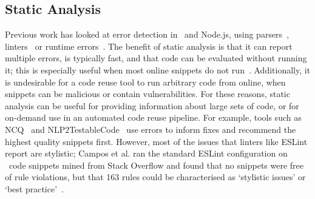 \documentclass[conference]{IEEEtran}
\begin{document}

\subsection{Static Analysis}

Previous work has looked at error detection in \js\ and Node.js, using parsers~\cite{yang2016query}, linters~\cite{campos2019mining, reidNCQ} or runtime errors~\cite{chinthanet2021makes, yang2016query}. The benefit of static analysis is that it can report multiple errors, is typically fast, and that code can be evaluated without running it; this is especially useful when most online snippets do not run~\cite{chinthanet2021makes, yang2016query}. Additionally, it is undesirable for a code reuse tool to run arbitrary code from online, when snippets can be malicious or contain vulnerabilities.  For these reasons, static analysis can be useful for providing information about large sets of code, or for on-demand use in an automated code reuse pipeline. For example, tools such as NCQ~\cite{reidNCQ} and NLP2TestableCode~\cite{reidnlp2tc} use errors to inform fixes and recommend the highest quality snippets first. However, most of the issues that linters like ESLint report are stylistic; Campos et al. ran the standard ESLint configuration on \js\ code snippets mined from Stack Overflow and found that no snippets were free of rule violations, but that 163 rules could be characterised as `stylistic issues' or `best practice'~\cite{campos2019mining}.
\end{document}
